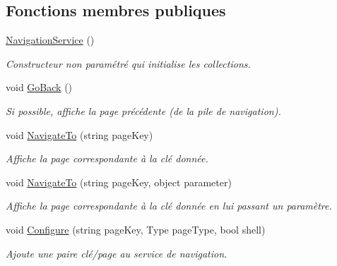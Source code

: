 \subsection*{Fonctions membres publiques}
\begin{DoxyCompactItemize}
\item 
\hyperlink{class_boxes_1_1_services_1_1_navigation_1_1_navigation_service_a25ba7c409be2fdd20a4e0e89e73fa604}{Navigation\+Service} ()
\begin{DoxyCompactList}\small\item\em Constructeur non paramétré qui initialise les collections. \end{DoxyCompactList}\item 
void \hyperlink{class_boxes_1_1_services_1_1_navigation_1_1_navigation_service_a356a6266e3489ea34daa0194060e9479}{Go\+Back} ()
\begin{DoxyCompactList}\small\item\em Si possible, affiche la page précédente (de la pile de navigation). \end{DoxyCompactList}\item 
void \hyperlink{class_boxes_1_1_services_1_1_navigation_1_1_navigation_service_a611e1366caa613a1c58011d69750dc18}{Navigate\+To} (string page\+Key)
\begin{DoxyCompactList}\small\item\em Affiche la page correspondante à la clé donnée. \end{DoxyCompactList}\item 
void \hyperlink{class_boxes_1_1_services_1_1_navigation_1_1_navigation_service_a250bfa141ce7c4a8a1da8c65e06b0681}{Navigate\+To} (string page\+Key, object parameter)
\begin{DoxyCompactList}\small\item\em Affiche la page correspondante à la clé donnée en lui passant un paramètre. \end{DoxyCompactList}\item 
void \hyperlink{class_boxes_1_1_services_1_1_navigation_1_1_navigation_service_a72db0b266a8b1b3371269a0712483fff}{Configure} (string page\+Key, Type page\+Type, bool shell)
\begin{DoxyCompactList}\small\item\em Ajoute une paire clé/page au service de navigation. \end{DoxyCompactList}\end{DoxyCompactItemize}
